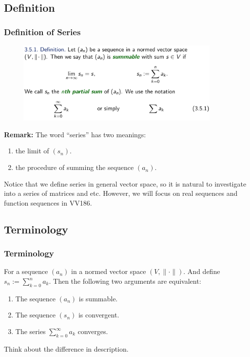 \documentclass[10pt, t]{beamer}
\begin{document}
\subsection{Definition}
\begin{frame}
    \frametitle{Definition of Series}
    \begin{figure}[H]
        \centering
        \includegraphics[width=0.9\textwidth]{2020-11-11-12-56-31.png}
    \end{figure}
    \textbf{Remark:} The word ``series'' has two meanings:
    \begin{enumerate}
        \item the limit of $(s_n)$.
        \item the procedure of summing the sequence $(a_n)$.
    \end{enumerate}
    Notice that we define series in general vector space, so it is natural to investigate into a series of matrices and etc. However, we will focus on real sequences and function sequences in VV186.
\end{frame}

\subsection{Terminology}
\begin{frame}
    \frametitle{Terminology}
    For a sequence $(a_n)$ in a normed vector space $(V,\|\cdot\|)$. And define $s_n:=\sum_{k=0}^na_k$. Then the following two arguments are equivalent:
    \begin{enumerate}
        \item The sequence $(a_n)$ is summable.
        \item The sequence $(s_n)$ is convergent.
        \item The series $\sum_{k=0}^\infty a_k$ converges.
    \end{enumerate}
    Think about the difference in description.

\end{frame}
\end{document}
